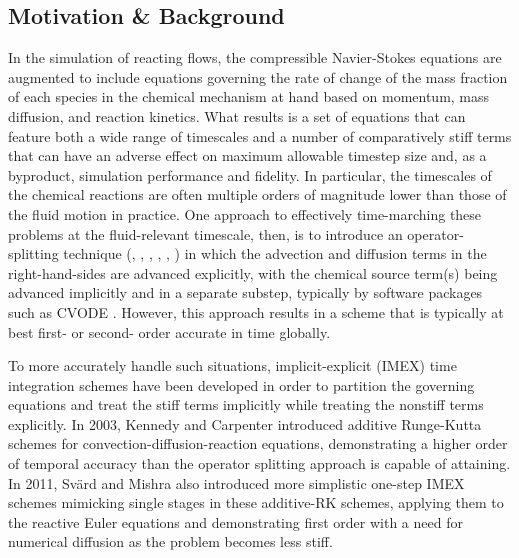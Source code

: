 \subsection{Motivation \& Background} \label{sec:timeint_bg}


In the simulation of reacting flows, the compressible Navier-Stokes
equations are augmented to include equations governing the rate of
change of the mass fraction of each species in the chemical mechanism
at hand based on momentum, mass diffusion, and reaction kinetics. What
results is a set of equations that can feature both a wide range of
timescales and a number of comparatively stiff terms that can have
an adverse effect on maximum allowable timestep size and, as a byproduct,
simulation performance and fidelity. In particular, the timescales
of the chemical reactions are often multiple orders of magnitude lower
than those of the fluid motion in practice. One approach to effectively
time-marching these problems at the fluid-relevant timescale, then, is
to introduce an operator-splitting technique (\cite{sportisse2000method},
\cite{strang1968construction}, \cite{lapointe2020data}, \cite{macart2016semi},
\cite{ren2008second}, \cite{knio1999semi}) in which the advection
and diffusion terms in the right-hand-sides are advanced explicitly,
with the chemical source term(s) being advanced implicitly and
in a separate substep, typically by software packages such as CVODE \cite{cohen1996cvode}.
However, this approach results in a scheme that is typically at best
first- or second- order accurate in time globally.

To more accurately handle such situations, implicit-explicit (IMEX) time
integration schemes have been developed in order to partition the
governing equations and treat the stiff terms implicitly while treating
the nonstiff terms explicitly. In 2003, Kennedy and Carpenter \cite{kennedy2003additive}
introduced additive Runge-Kutta schemes for convection-diffusion-reaction equations,
demonstrating a higher order of temporal accuracy than the operator splitting
approach is capable of attaining. In 2011, Sv{\"a}rd and Mishra \cite{svard2011implicit}
also introduced more simplistic one-step IMEX schemes mimicking single stages in these
additive-RK schemes, applying them to the reactive Euler equations and
demonstrating first order with a need for numerical diffusion as the problem
becomes less stiff.

